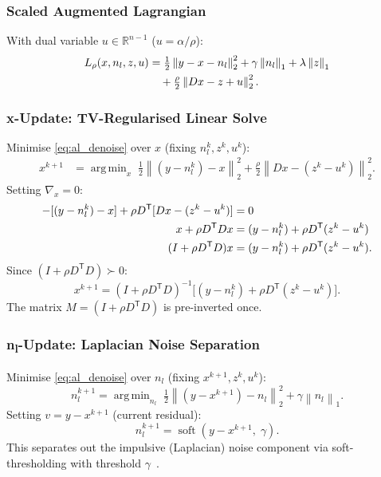 \documentclass[journal,twoside,10pt]{IEEEtran}
\DeclareMathOperator*{\argmin}{arg\,min}
\newcommand{\norm}[1]{\left\lVert#1\right\rVert}
\newcommand{\R}{\mathbb{R}}
\newcommand{\T}{^{\mathsf{T}}}
\begin{document}
\subsubsection{Scaled Augmented Lagrangian}

With dual variable $u\in\R^{n-1}$ ($u=\alpha/\rho$):
\begin{align}
  L_\rho(x,n_l,z,u) &= \tfrac{1}{2}\norm{y-x-n_l}_2^2+\gamma\norm{n_l}_1+\lambda\norm{z}_1
  \notag\\
  &\quad+\tfrac{\rho}{2}\norm{Dx-z+u}_2^2.
  \label{eq:al_denoise}
\end{align}

\subsubsection{\textbf{x}-Update: TV-Regularised Linear Solve}

Minimise \eqref{eq:al_denoise} over $x$ (fixing $n_l^k,z^k,u^k$):
\begin{align}
  x^{k+1}&=\argmin_x\;\tfrac{1}{2}\norm{(y-n_l^k)-x}_2^2+\tfrac{\rho}{2}\norm{Dx-(z^k-u^k)}_2^2.
\end{align}
Setting $\nabla_x=0$:
\begin{align}
  -[(y-n_l^k)-x]+\rho D\T[Dx-(z^k-u^k)]&=0\notag\\
  x+\rho D\T Dx &= (y-n_l^k)+\rho D\T(z^k-u^k)\notag\\
  (I+\rho D\T D)x &= (y-n_l^k)+\rho D\T(z^k-u^k).
\end{align}
Since $(I+\rho D\T D)\succ 0$:
\begin{equation}
  \boxed{x^{k+1}=(I+\rho D\T D)^{-1}\!\bigl[(y-n_l^k)+\rho D\T(z^k-u^k)\bigr].}
  \label{eq:x_update_denoise}
\end{equation}
The matrix $M=(I+\rho D\T D)$ is pre-inverted once.

\subsubsection{\textbf{n\textsubscript{l}}-Update: Laplacian Noise Separation}

Minimise \eqref{eq:al_denoise} over $n_l$ (fixing $x^{k+1},z^k,u^k$):
\begin{equation}
  n_l^{k+1}=\argmin_{n_l}\;\tfrac{1}{2}\norm{(y-x^{k+1})-n_l}_2^2+\gamma\norm{n_l}_1.
\end{equation}
Setting $v=y-x^{k+1}$ (current residual):
\begin{equation}
  \boxed{n_l^{k+1}=\operatorname{soft}(y-x^{k+1},\;\gamma).}
  \label{eq:nl_update}
\end{equation}
This separates out the impulsive (Laplacian) noise component via soft-thresholding with threshold
$\gamma$~\cite{baraldi2019,selesnick2012}.
\end{document}
